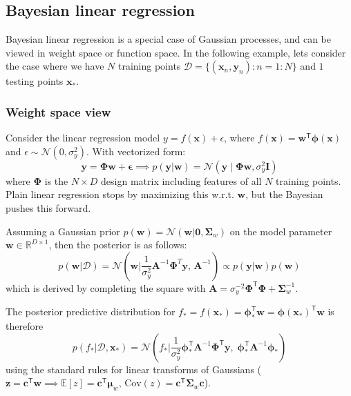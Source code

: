 \documentclass[11pt]{article}
\begin{document}
\subsection{Bayesian linear regression}
Bayesian linear regression is a special case of Gaussian processes, and can be viewed in weight space or function space.
In the following example, lets consider the case where we have $N$ training points $\mathcal{D} = \{ (\boldsymbol{x}_n, \boldsymbol{y}_n) : n = 1 : N \}$ and $1$ testing points $\boldsymbol{x}_*$.

\subsubsection*{Weight space view}
Consider the linear regression model $y = f(\boldsymbol{x}) + \epsilon$, where $f(\boldsymbol{x}) = \boldsymbol{w}^\mathsf{T} \boldsymbol{\phi}(\boldsymbol{x})$ and $\epsilon \sim \mathcal{N}(0, \sigma_y^2)$. With vectorized form:
\[
\boldsymbol{y} = \boldsymbol{\Phi} \boldsymbol{w} + \boldsymbol{\epsilon} \implies p(\boldsymbol{y} | \boldsymbol{w}) = \mathcal{N}(\boldsymbol{y} \mid \boldsymbol{\Phi} \boldsymbol{w}, \sigma_y^2 \mathbf{I})
\]
where $\boldsymbol{\Phi}$ is the $N \times D$ design matrix including features of all $N$ training points.
Plain linear regression stops by maximizing this w.r.t. $\boldsymbol{w}$, but the Bayesian pushes this forward.

Assuming a Gaussian prior $p(\boldsymbol{w}) = \mathcal{N}(\boldsymbol{w} | \boldsymbol{0}, \boldsymbol{\Sigma}_w)$ on the model parameter $\boldsymbol{w} \in \mathbb{R}^{D \times 1}$, then the posterior is as follows:
\[
p(\boldsymbol{w} | \mathcal{D}) = \mathcal{N}\left(\boldsymbol{w} \Big| \frac{1}{\sigma_y^2} \mathbf{A}^{-1} \boldsymbol{\Phi}^T \boldsymbol{y}, \, \mathbf{A}^{-1}\right) \propto p(\boldsymbol{y} | \boldsymbol{w}) p(\boldsymbol{w}) 
\]
which is derived by completing the square with $\mathbf{A} = \sigma_y^{-2} \boldsymbol{\Phi}^\mathsf{T} \boldsymbol{\Phi} + \boldsymbol{\Sigma}_w^{-1}$.

The posterior predictive distribution for $f_* = f(\boldsymbol{x}_*) = \boldsymbol{\phi}_*^\mathsf{T} \boldsymbol{w} = \boldsymbol{\phi}(\boldsymbol{x}_*)^\mathsf{T} \boldsymbol{w}$ is therefore
\[
p(f_* | \mathcal{D}, \boldsymbol{x}_*) = \mathcal{N}\left(f_* \Big| \frac{1}{\sigma_y^2} \boldsymbol{\phi}_*^\mathsf{T} \mathbf{A}^{-1} \boldsymbol{\Phi}^\mathsf{T} \boldsymbol{y}, \; \boldsymbol{\phi}_*^\mathsf{T} \mathbf{A}^{-1} \boldsymbol{\phi}_*\right)
\]
using the standard rules for linear transforms of Gaussians ($\boldsymbol{z} = \boldsymbol{c}^\mathsf{T} \boldsymbol{w} \implies \mathbb{E}[z] = \boldsymbol{c}^\mathsf{T} \boldsymbol{\mu}_w$, $\text{Cov}(z) = \boldsymbol{c}^\mathsf{T} \boldsymbol{\Sigma}_{w} \boldsymbol{c}$).
\end{document}
